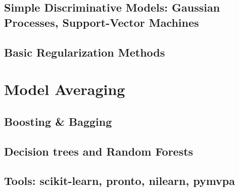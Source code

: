 \documentclass{beamer}
\begin{document}
    \subsection{Simple Discriminative Models: Gaussian Processes, Support-Vector Machines} 
    \subsection{Basic Regularization Methods}                                
\section{Model Averaging}
    \subsection{Boosting \& Bagging}                                         
    \subsection{Decision trees and Random Forests}                           
    \subsection{Tools: scikit-learn, pronto, nilearn, pymvpa}                
\end{document}
